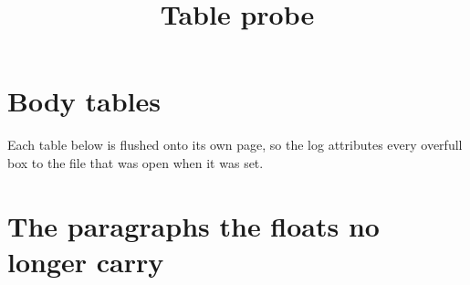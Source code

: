 \documentclass[journal,twoside]{IEEEtran}
\begin{document}
\title{Table probe}
\author{}
\maketitle
\section{Body tables}
Each table below is flushed onto its own page, so the log attributes every overfull box to the
file that was open when it was set.
\clearpage
\clearpage
\clearpage
\clearpage
\clearpage
\clearpage
\clearpage
\clearpage
\clearpage
\clearpage
\appendices

\section{The paragraphs the floats no longer carry}









\end{document}
